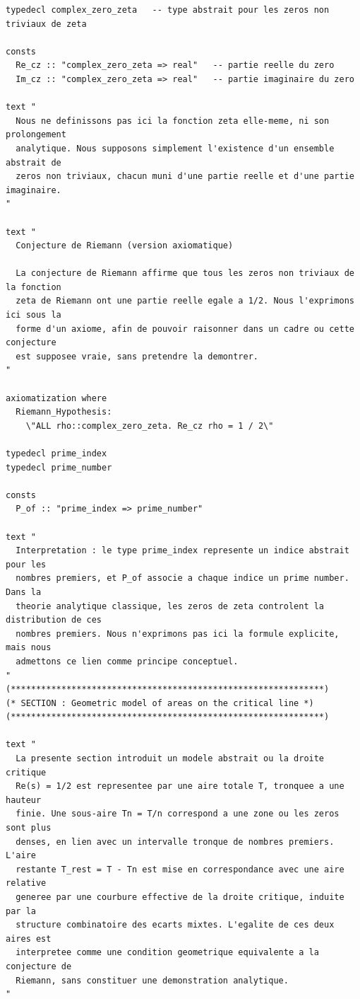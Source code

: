 \documentclass[a4paper,11pt]{article}
\begin{document}
\begin{holcode}[title={\textcolor{white}{File: methode\_spectral.thy -- Part 6/6 (END)}}]
\begin{lstlisting}
typedecl complex_zero_zeta   -- type abstrait pour les zeros non triviaux de zeta

consts
  Re_cz :: "complex_zero_zeta => real"   -- partie reelle du zero
  Im_cz :: "complex_zero_zeta => real"   -- partie imaginaire du zero

text "
  Nous ne definissons pas ici la fonction zeta elle-meme, ni son prolongement
  analytique. Nous supposons simplement l'existence d'un ensemble abstrait de
  zeros non triviaux, chacun muni d'une partie reelle et d'une partie imaginaire.
"

text "
  Conjecture de Riemann (version axiomatique)

  La conjecture de Riemann affirme que tous les zeros non triviaux de la fonction
  zeta de Riemann ont une partie reelle egale a 1/2. Nous l'exprimons ici sous la
  forme d'un axiome, afin de pouvoir raisonner dans un cadre ou cette conjecture
  est supposee vraie, sans pretendre la demontrer.
"

axiomatization where
  Riemann_Hypothesis:
    \"ALL rho::complex_zero_zeta. Re_cz rho = 1 / 2\"

typedecl prime_index
typedecl prime_number

consts
  P_of :: "prime_index => prime_number"

text "
  Interpretation : le type prime_index represente un indice abstrait pour les
  nombres premiers, et P_of associe a chaque indice un prime number. Dans la
  theorie analytique classique, les zeros de zeta controlent la distribution de ces
  nombres premiers. Nous n'exprimons pas ici la formule explicite, mais nous
  admettons ce lien comme principe conceptuel.
"
(**************************************************************)
(* SECTION : Geometric model of areas on the critical line *)
(**************************************************************)

text "
  La presente section introduit un modele abstrait ou la droite critique
  Re(s) = 1/2 est representee par une aire totale T, tronquee a une hauteur
  finie. Une sous-aire Tn = T/n correspond a une zone ou les zeros sont plus
  denses, en lien avec un intervalle tronque de nombres premiers. L'aire
  restante T_rest = T - Tn est mise en correspondance avec une aire relative
  generee par une courbure effective de la droite critique, induite par la
  structure combinatoire des ecarts mixtes. L'egalite de ces deux aires est
  interpretee comme une condition geometrique equivalente a la conjecture de
  Riemann, sans constituer une demonstration analytique.
"


\end{lstlisting}
\end{holcode}
\end{document}
